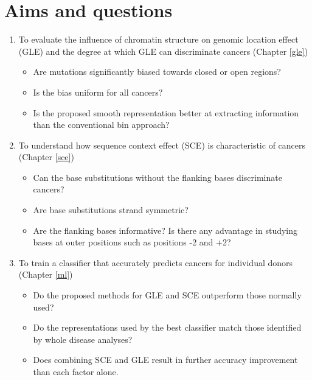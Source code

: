 \section{Aims and questions}
\label{intro:aims}
\begin{enumerate}
    \item To evaluate the influence of chromatin structure on genomic location effect (GLE) and the degree at which GLE can discriminate cancers (Chapter \ref{gle})
    \begin{itemize}
        \item Are mutations significantly biased towards closed or open regions?
        \item Is the bias uniform for all cancers?
        \item Is the proposed smooth representation better at extracting information than the conventional bin approach?
    \end{itemize}
    \item To understand how sequence context effect (SCE) is characteristic of cancers (Chapter \ref{sce})
    \begin{itemize}
        \item Can the base substitutions without the flanking bases discriminate cancers?
        \item Are base substitutions strand symmetric?
        \item Are the flanking bases informative? Is there any advantage in studying bases at outer positions such as positions -2 and +2?
    \end{itemize}
    \item To train a classifier that accurately predicts cancers for individual donors (Chapter \ref{ml})
    \begin{itemize}
        \item Do the proposed methods for GLE and SCE outperform those normally used?
        \item Do the representations used by the best classifier match those identified by whole disease analyses?
        \item Does combining SCE and GLE result in further accuracy improvement than each factor alone.
    \end{itemize}
\end{enumerate}

